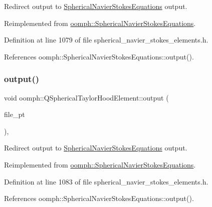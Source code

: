 Redirect output to \hyperlink{classoomph_1_1SphericalNavierStokesEquations}{Spherical\+Navier\+Stokes\+Equations} output. 



Reimplemented from \hyperlink{classoomph_1_1SphericalNavierStokesEquations_a5506adeb5ecb11e16254b5ee48049c5d}{oomph\+::\+Spherical\+Navier\+Stokes\+Equations}.



Definition at line 1079 of file spherical\+\_\+navier\+\_\+stokes\+\_\+elements.\+h.



References oomph\+::\+Spherical\+Navier\+Stokes\+Equations\+::output().

\mbox{\label{classoomph_1_1QSphericalTaylorHoodElement_aa45522c214c7cb5ff01724ebafe988c6}} 
\subsubsection{\texorpdfstring{output()}{output()}\hspace{0.1cm}{\footnotesize\ttfamily [3/4]}}
{\footnotesize\ttfamily void oomph\+::\+Q\+Spherical\+Taylor\+Hood\+Element\+::output (\begin{DoxyParamCaption}\item[{F\+I\+LE $\ast$}]{file\+\_\+pt }\end{DoxyParamCaption})\hspace{0.3cm}{\ttfamily [inline]}, {\ttfamily [virtual]}}



Redirect output to \hyperlink{classoomph_1_1SphericalNavierStokesEquations}{Spherical\+Navier\+Stokes\+Equations} output. 



Reimplemented from \hyperlink{classoomph_1_1SphericalNavierStokesEquations_a76ad2e32bc8d2efa6242e78ea66076ed}{oomph\+::\+Spherical\+Navier\+Stokes\+Equations}.



Definition at line 1083 of file spherical\+\_\+navier\+\_\+stokes\+\_\+elements.\+h.



References oomph\+::\+Spherical\+Navier\+Stokes\+Equations\+::output().

